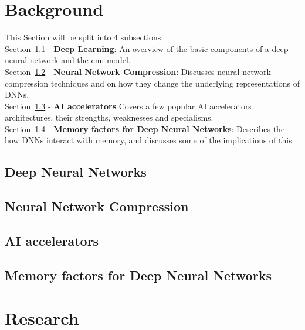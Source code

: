 \documentclass[11pt]{article}
\begin{document}
\section{Background}
This Section will be split into 4 subsections:\\
Section~\ref{subsec:deepLearning} - \textbf{Deep Learning}: An overview of the basic components of a deep neural network and the \acrshort{cnn} model.\\
Section~\ref{subsec:compressionTypes} - \textbf{Neural Network Compression}: Discusses neural network compression techniques and on how they change the underlying representations of DNNs.\\
Section~\ref{subsec:AIaccelerators} - \textbf{AI accelerators} Covers a few popular AI accelerators architectures, their strengths, weaknesses and specialisms.\\
Section~\ref{subsec:hardwareArch} - \textbf{Memory factors for Deep Neural Networks}: Describes the how DNNs interact with memory, and discusses some of the implications of this.

\subsection{Deep Neural Networks}\label{subsec:deepLearning}


\newpage
\subsection{Neural Network Compression}\label{subsec:compressionTypes}


\newpage
\subsection{AI accelerators}\label{subsec:AIaccelerators}


\newpage
\subsection{Memory factors for Deep Neural Networks}\label{subsec:hardwareArch}


\newpage
\section{Research}

\end{document}
